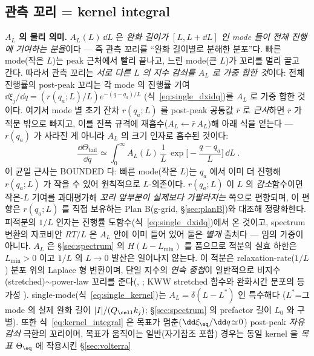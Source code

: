 \subsection{관측 꼬리 = kernel integral}\label{sec:kernel}
\textbf{$A_L$ 의 물리 의미.} $A_L(L)\,\dd L$ 은 \emph{완화 길이가 $[L,L+\dd L]$ 인 mode 들이 전체 진행에 기여하는
분율}이다 — 즉 관측 꼬리를 ``완화 길이별로 분해한 분포''다. 빠른 mode(작은 $L$)는 peak 근처에서 빨리 끝나고,
느린 mode(큰 $L$)가 꼬리를 멀리 끌고 간다. 따라서 관측 꼬리는 \emph{서로 다른 $L$ 의 지수 감쇠를 $A_L$ 로 가중
합한 것}이다: 전체 진행률의 post-peak 꼬리는 각 mode 의 진행률 기여 $\dd\xi_j/\dd q=(r(q_a;L)/L)e^{-(q-q_a)/L}$
(식~\eqref{eq:single_dxidq})를 $A_L$ 로 가중 합한 것이다. 여기서 mode 별 초기 잔차 $r(q_a;L)$ 를 post-peak
공통값 $\bar r$ 로 \emph{근사}하면 $\bar r$ 가 적분 밖으로 빠지고, 이를 진폭 규격에 재흡수($A_L\!\leftarrow\!\bar r\,A_L$)해
아래 식을 얻는다 — $r(q_a)$ 가 사라진 게 아니라 $A_L$ 의 크기 인자로 흡수된 것이다:
\begin{equation}
\boxed{\;\frac{\dd\Theta_\mathrm{tail}}{\dd q}\simeq\int_0^\infty A_L(L)\,\frac1L\,
\exp\!\Big[-\frac{q-q_a}{L}\Big]\,\dd L\;.}
\label{eq:kernel_integral}
\end{equation}
이 균일 근사는 BOUNDED 다: 빠른 mode(작은 $L$)는 $q_a$ 에서 이미 더 진행해 $r(q_a;L)$ 가 작을 수 있어 원칙적으로
$L$-의존이다. $r(q_a;L)$ 이 $L$ 의 \emph{감소}함수이면 작은-$L$ 기여를 과대평가해 \emph{꼬리 앞부분이 실제보다
가팔라지는} 쪽으로 편향되며, 이 편향은 $r(q_a;L)$ 를 직접 보유하는 Plan B(g-grid, \S\ref{sec:planB})와 대조해
정량화한다. 피적분의 $1/L$ 인자는 진행률 도함수(식~\eqref{eq:single_dxidq})에서 온 것이고, spectrum 변환의
자코비안 $RT/L$ 은 $A_L$ 안에 이미 들어 있어 둘은 \emph{별개} 출처다 — 임의 가중이 아니다. $A_L$ 은 \S\ref{sec:spectrum}
의 $H(L-L_{\min})$ 를 품으므로 적분의 실효 하한은 $L_{\min}>0$ 이고 $1/L$ 의 $L\!\to\!0$ 발산은 일어나지 않는다.
이 적분은 relaxation-rate($1/L$) 분포 위의 Laplace 형 변환이며, 단일 지수의 \emph{연속 중첩}이 일반적으로 비지수
(stretched)$\sim$power-law 꼬리를 준다(, \cite{johnston2006}; KWW stretched 함수와 완화시간 분포의
등가성 \cite{lindsey1980}). single-mode(식~\eqref{eq:single_kernel})는 $A_L=\delta(L-L^\ast)$ 인 특수해다
($L^\ast$=그 mode 의 실제 완화 길이 $|I|/(Q_\cell k_j)$; \S\ref{sec:spectrum} 의 prefactor 길이 $L_0$ 와 구별).
또한 식~\eqref{eq:kernel_integral} 은 목표가 멈춘($\dd\xi_\eq/\dd q\!\simeq\!0$) post-peak \emph{자유감쇠} 극한의 꼬리이며,
목표가 움직이는 일반(자기참조 포함) 경우는 동일 kernel 을 \emph{목표} $\Theta_\eq$ 에 작용시킨 \S\ref{sec:volterra}
